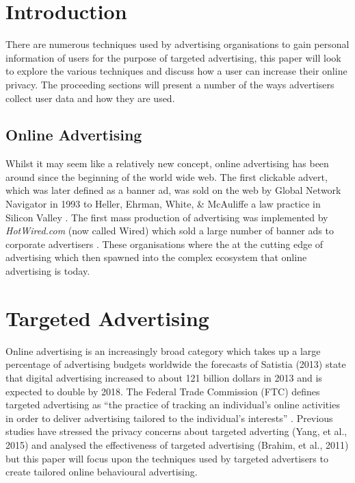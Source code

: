 \documentclass{article}
\begin{document}
\section{Introduction}
There are numerous techniques used by advertising organisations to gain personal information of users for the purpose of targeted advertising, this paper will look to explore the various techniques and discuss how a user can increase their online privacy. The proceeding sections will present a number of the ways advertisers collect user data and how they are used.  

\subsection{Online Advertising}
Whilst it may seem like a relatively new concept, online advertising has been around since the beginning of the world wide web. The first clickable advert, which was later defined as a banner ad, was sold on the web by Global Network Navigator in 1993 to Heller, Ehrman, White, \& McAuliffe a law practice in Silicon Valley \parencite{oreilly}. The first mass production of advertising was implemented by \textit{HotWired.com} (now called Wired) which sold a large number of banner ads to corporate advertisers \parencite{firstAd}. These organisations where the at the cutting edge of advertising which then spawned into the complex ecosystem that online advertising is today.

\section{Targeted Advertising}
Online advertising is an increasingly broad category which takes up a large percentage of advertising budgets worldwide the forecasts of Satistia (2013) state that digital advertising increased to about 121 billion dollars in 2013 and is expected to double by 2018. The Federal Trade Commission (FTC) defines targeted advertising as ``the practice of tracking an individual’s online activities in order to deliver advertising tailored to the individual’s interests'' \parencite{comission2009}. Previous studies have stressed the privacy concerns about targeted adverting (Yang, et al., 2015) and analysed the effectiveness of targeted advertising (Brahim, et al., 2011) but this paper will focus upon the techniques used by targeted advertisers to create tailored online behavioural advertising. \newline
\end{document}
